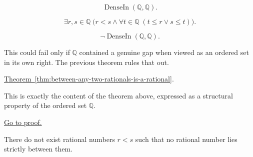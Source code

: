 \begin{remark*}
\[
\operatorname{DenseIn}(\mathbb{Q},\mathbb{Q}).
\]
\end{remark*}

\begin{remark*}
\[
\exists r,s\in\mathbb{Q}\;
\bigl(r<s \land \forall t\in\mathbb{Q}\;(t\le r \lor s\le t)\bigr).
\]
\end{remark*}

\begin{remark*}
\[
\neg\operatorname{DenseIn}(\mathbb{Q},\mathbb{Q}).
\]
\end{remark*}

\begin{remark*}
This could fail only if $\mathbb{Q}$ contained a genuine gap when viewed as an
ordered set in its own right. The previous theorem rules that out.
\end{remark*}

\begin{remark*}[Dependencies]
\hyperref[thm:between-any-two-rationals-is-a-rational]{Theorem~\ref*{thm:between-any-two-rationals-is-a-rational}}.
\end{remark*}

\begin{remark*}
This is exactly the content of the theorem above, expressed as a structural
property of the ordered set $\mathbb{Q}$.
\end{remark*}

\begin{remark*}[Proof]
\hyperref[prf:q-dense-in-itself]{Go to proof.}
\end{remark*}

\begin{tcolorbox}[colback=thmbox, colframe=thmborder, arc=2pt,
  left=6pt, right=6pt, top=4pt, bottom=4pt,
  title={\small\textbf{Corollary (The Rational Numbers Have No Adjacent Points)}},
  fonttitle=\small\bfseries]
\begin{corollary}
\label{cor:q-has-no-adjacent-points}
There do not exist rational numbers $r<s$ such that no rational number lies
strictly between them.
\end{corollary}
\end{tcolorbox}

